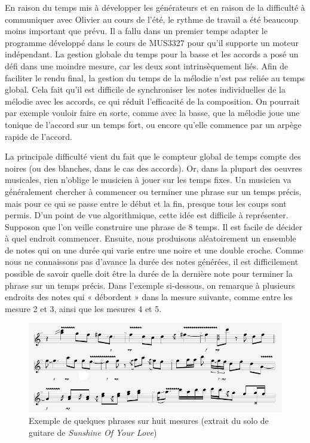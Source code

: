 \documentclass[letterpaper,12pt]{scrartcl}
\begin{document}
	En raison du temps mis à développer les générateurs et en raison de la difficulté à communiquer avec Olivier au cours de l'été, le rythme de travail a été beaucoup moins important que prévu. Il a fallu dans un premier temps adapter le programme développé dans le cours de MUS3327 pour qu'il supporte un moteur indépendant. La gestion globale du temps pour la basse et les accords a posé un défi dans une moindre mesure, car les deux sont intrinsèquement liés. Afin de faciliter le rendu final, la gestion du temps de la mélodie n'est pas reliée au temps global. Cela fait qu'il est difficile de synchroniser les notes individuelles de la mélodie avec les accords, ce qui réduit l'efficacité de la composition. On pourrait par exemple vouloir faire en sorte, comme avec la basse, que la mélodie joue une tonique de l'accord sur un temps fort, ou encore qu'elle commence par un arpège rapide de l'accord. 
	
	La principale difficulté vient du fait que le compteur global de temps compte des noires (ou des blanches, dans le cas des accords). Or, dans la plupart des oeuvres musicales, rien n'oblige le musicien à jouer sur les temps fixes. Un musicien va généralement chercher à commencer ou terminer une phrase sur un temps précis, mais pour ce qui se passe entre le début et la fin, presque tous les coups sont permis. D'un point de vue algorithmique, cette idée est difficile à représenter. Supposon que l'on veille construire une phrase de 8 temps. Il est facile de décider à quel endroit commencer. Ensuite, nous produisons aléatoirement un ensemble de notes qui on une durée qui varie entre une noire et une double croche. Comme nous ne connaissons pas d'avance la durée des notes générées, il est difficilement possible de savoir quelle doit être la durée de la dernière note pour terminer la phrase sur un temps précis. Dans l'exemple si-dessous, on remarque à plusieurs endroits des notes qui « débordent » dans la mesure suivante, comme entre les mesure 2 et 3, ainsi que les mesures 4 et 5.
	
\begin{figure}[H]
\caption{Exemple de quelques phrases sur huit mesures (extrait du solo de guitare de \textit{Sunshine Of Your Love})}
\centering
\includegraphics[scale=0.5]{phrase.png}
\end{figure}	
	
\end{document}
